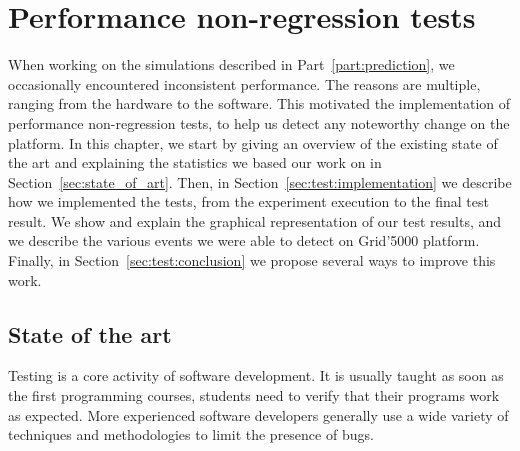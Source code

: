 \chapter{Performance non-regression tests}%
\label{chapter:experiment:tests}
    When working on the simulations described in Part~\ref{part:prediction}, we occasionally encountered inconsistent
    performance. The reasons are multiple, ranging from the hardware to the software. This motivated the implementation
    of performance non-regression tests, to help us detect any noteworthy change on the platform. In this chapter, we
    start by giving an overview of the existing state of the art and explaining the statistics we based our work on in
    Section~\ref{sec:state_of_art}. Then, in Section~\ref{sec:test:implementation} we describe how we implemented the
    tests, from the experiment execution to the final test result. We show and explain the graphical representation of
    our test results, and we describe the various events we were able to detect on Grid'5000 platform. Finally, in
    Section~\ref{sec:test:conclusion} we propose several ways to improve this work.

    \section{State of the art}%
    \label{sec:test:state_of_art}

        Testing is a core activity of software development. It is usually taught as soon as the first programming courses,
        students need to verify that their programs work as expected. More experienced software developers generally
        use a wide variety of techniques and methodologies to limit the presence of bugs.


